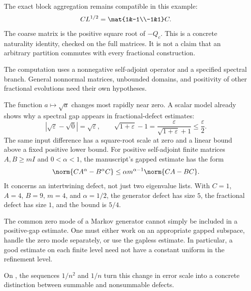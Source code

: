 The exact block aggregation remains compatible in this example:
\[
C L^{1/2}=\mat{1&-1\\-1&1}C.
\]
The coarse matrix is the positive square root of $-Q_c$. This is a concrete naturality identity, checked on the full matrices. It is not a claim that an arbitrary partition commutes with every fractional construction.

The computation uses a nonnegative self-adjoint operator and a specified spectral branch. General nonnormal matrices, unbounded domains, and positivity of other fractional evolutions need their own hypotheses.

The function $a\mapsto\sqrt a$ changes most rapidly near zero. A scalar model already shows why a spectral gap appears in fractional-defect estimates:
\[
|\sqrt\varepsilon-\sqrt0|=\sqrt\varepsilon,
\qquad
\sqrt{1+\varepsilon}-1
=\frac{\varepsilon}{\sqrt{1+\varepsilon}+1}\le\frac\varepsilon2.
\]
The same input difference has a square-root scale at zero and a linear bound above a fixed positive lower bound.
For positive self-adjoint finite matrices $A,B\ge mI$ and $0<\alpha<1$, the manuscript's gapped estimate has the form
\[
\norm{CA^\alpha-B^\alpha C}
\le \alpha m^{\alpha-1}\norm{CA-BC}.
\]
It concerns an intertwining defect, not just two eigenvalue lists. With $C=1$, $A=4$, $B=9$, $m=4$, and $\alpha=1/2$, the generator defect has size $5$, the fractional defect has size $1$, and the bound is $5/4$.

The common zero mode of a Markov generator cannot simply be included in a positive-gap estimate. One must either work on an appropriate gapped subspace, handle the zero mode separately, or use the gapless estimate. In particular, a good estimate on each finite level need not have a constant uniform in the refinement level.

On , the sequences $1/n^2$ and $1/n$ turn this change in error scale into a concrete distinction between summable and nonsummable defects.

